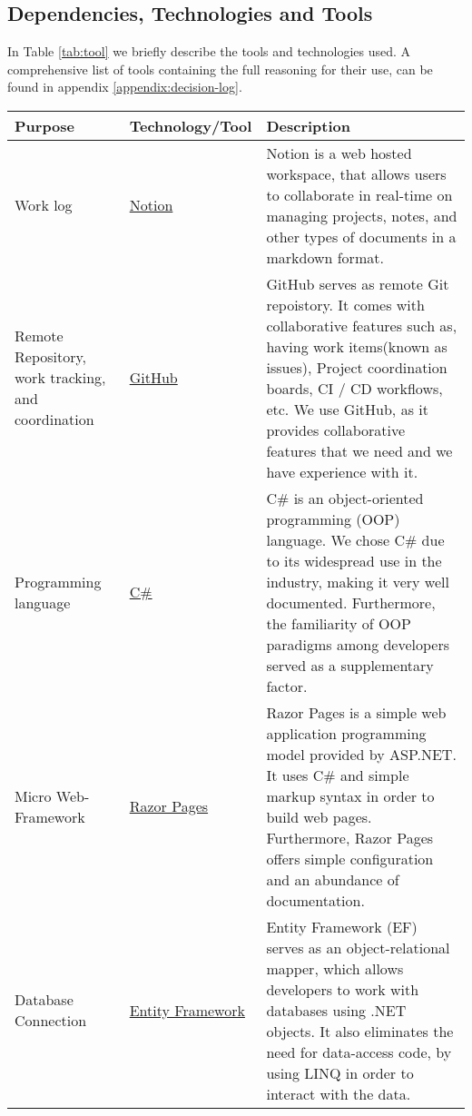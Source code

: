 
\subsection{Dependencies, Technologies and Tools}


In Table \ref{tab:tool} we briefly describe the tools and technologies used. A comprehensive list of tools containing the full reasoning for their use, can be found in appendix \ref{appendix:decision-log}.

\begin{longtable}{|p{}|p{} | p{}|}
    \hline
    \textbf{Purpose} & \textbf{Technology/Tool} & \textbf{Description}\\
    \hline
    Work log & \href{https://www.notion.so/help/guides/category/documentation}{Notion} & Notion is a web hosted workspace, that allows users to collaborate in real-time on managing projects, notes, and other types of documents in a markdown format.\\
    \hline
    Remote Repository, work tracking, and coordination & \href{https://github.com/features}{GitHub} & GitHub serves as remote Git repoistory. It comes with collaborative features such as, having work items(known as issues), Project coordination boards, CI / CD workflows, etc. We use GitHub, as it provides collaborative features that we need and we have experience with it.\\
    \hline
    Programming language & \href{https://learn.microsoft.com/en-us/dotnet/csharp/}{C\#} &
    C\# is an object-oriented programming (OOP) language. We chose C\# due to its widespread use in the industry, making it very well documented. Furthermore, the familiarity of OOP paradigms among developers served as a supplementary factor.\\
    \hline
    Micro Web-Framework & \href{https://learn.microsoft.com/en-us/aspnet/core/razor-pages/?view=aspnetcore-8.0&tabs=visual-studio}{Razor Pages} & Razor Pages is a simple web application programming model provided by ASP.NET. It uses C\# and simple markup syntax in order to build web pages. Furthermore, Razor Pages offers simple configuration and an abundance of documentation.\\
    \hline
    Database Connection & \href{https://learn.microsoft.com/en-us/ef/core/}{Entity Framework} & Entity Framework (EF) serves as an object-relational mapper, which allows developers to work with databases using .NET objects. It also eliminates the need for data-access code, by using LINQ in order to interact with the data.\\

\end{longtable}
